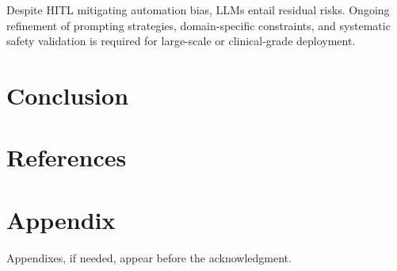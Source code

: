 \documentclass[journal,twoside,web]{ieeecolor}
\begin{document}
 Despite HITL mitigating automation bias, LLMs entail residual risks. Ongoing refinement of prompting strategies, domain-specific constraints, and systematic safety validation is required for large-scale or clinical-grade deployment.

\section{Conclusion}
\label{sec:conclusion}


\section*{References}

\vspace{-3ex} 




\appendices

\section*{Appendix}

Appendixes, if needed, appear before the acknowledgment.



\end{document}
